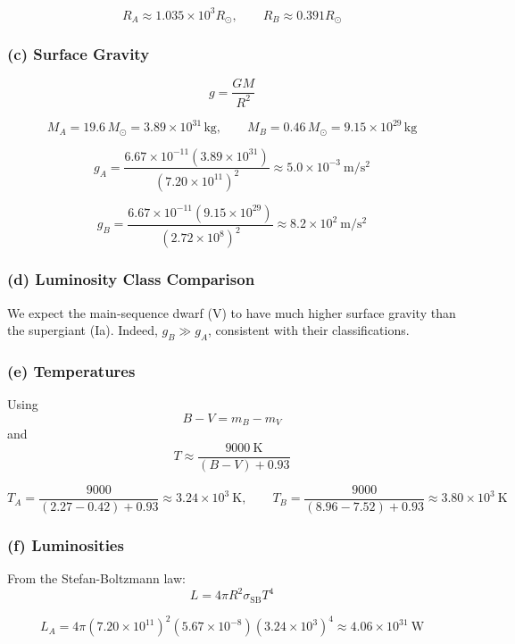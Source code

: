 \documentclass{article}
\begin{document}
\[
R_A \approx 1.035\times10^{3}R_\odot, \qquad
R_B \approx 0.391R_\odot
\]

\subsubsection*{(c) Surface Gravity}

\[
g = \frac{GM}{R^2}
\]

\[
M_A = 19.6\,M_\odot = 3.89\times10^{31}\,\mathrm{kg}, \qquad
M_B = 0.46\,M_\odot = 9.15\times10^{29}\,\mathrm{kg}
\]

\[
g_A = \frac{6.67\times10^{-11}(3.89\times10^{31})}{(7.20\times10^{11})^2}
     \approx 5.0\times10^{-3}~\mathrm{m/s^2}
\]

\[
g_B = \frac{6.67\times10^{-11}(9.15\times10^{29})}{(2.72\times10^{8})^2}
     \approx 8.2\times10^{2}~\mathrm{m/s^2}
\]

\subsubsection*{(d) Luminosity Class Comparison}

We expect the main-sequence dwarf (V) to have much higher surface gravity than the supergiant (Ia).  
Indeed, $g_B \gg g_A$, consistent with their classifications.

\subsubsection*{(e) Temperatures}

Using
\begin{equation}
B - V = m_B - m_V
\tag{13.35}
\end{equation}
and
\begin{equation}
T \approx \frac{9000~\mathrm{K}}{(B - V) + 0.93}
\tag{13.36}
\end{equation}

\[
T_A = \frac{9000}{(2.27 - 0.42) + 0.93} \approx 3.24\times10^{3}~\mathrm{K}, \qquad
T_B = \frac{9000}{(8.96 - 7.52) + 0.93} \approx 3.80\times10^{3}~\mathrm{K}
\]

\subsubsection*{(f) Luminosities}

From the Stefan-Boltzmann law:
\[
L = 4\pi R^2\sigma_\mathrm{SB}T^4
\]

\[
L_A = 4\pi(7.20\times10^{11})^2(5.67\times10^{-8})(3.24\times10^{3})^4
     \approx 4.06\times10^{31}~\mathrm{W}
\]
\end{document}
